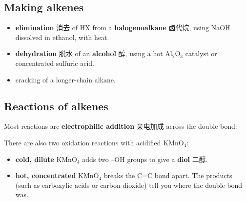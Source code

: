 \documentclass[11pt]{article}
\begin{document}
\subsection*{Making alkenes}

\begin{itemize}
\item \textbf{elimination} 消去 of $\text{HX}$ from a \textbf{halogenoalkane} 卤代烷, using $\text{NaOH}$ dissolved in ethanol, with heat.

\item \textbf{dehydration} 脱水 of an \textbf{alcohol} 醇, using a hot $\text{Al}_2\text{O}_3$ catalyst or concentrated sulfuric acid.

\item cracking of a longer-chain alkane.

\end{itemize}

\subsection*{Reactions of alkenes}

Most reactions are \textbf{electrophilic addition} 亲电加成 across the double bond:

\begin{center}
\end{center}

There are also two oxidation reactions with acidified $\text{KMnO}_4$:

\begin{itemize}
\item \textbf{cold, dilute} $\text{KMnO}_4$ adds two $\text{–OH}$ groups to give a \textbf{diol} 二醇.

\item \textbf{hot, concentrated} $\text{KMnO}_4$ breaks the C=C bond apart. The products (such as carboxylic acids or carbon dioxide) tell you where the double bond was.

\end{itemize}
\end{document}
